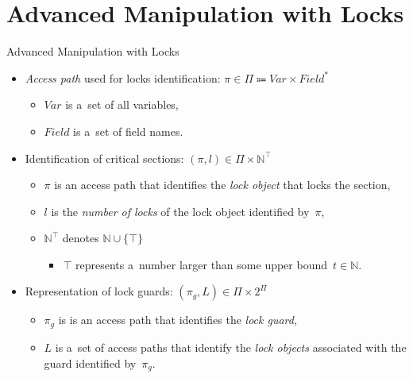 \documentclass[10pt, xcolor=pdflatex, hyperref={unicode}, aspectratio=169]{beamer}
\begin{document}
\section{Advanced Manipulation with Locks}
\begin{frame}{Advanced Manipulation with Locks}
    \begin{itemize}\setlength\itemsep{1.5em}
        \item \emph{Access path} used for \alert{locks identification}: $ \pi \in \Pi \Coloneqq Var \times Field^* $
            \smallskip
            \begin{itemize}\setlength\itemsep{.8em}
                \item $ Var $ is a~set of all variables,

                \item $ Field $ is a~set of field names.
            \end{itemize}

        \item Identification of \alert{critical sections}: $ (\pi, l) \in \Pi \times \mathbb{N}^\top $
            \smallskip
            \begin{itemize}\setlength\itemsep{.8em}
                \item $ \pi $ is an access path that identifies the \emph{lock object} that locks the section,

                \item $ l $ is the \emph{number of locks} of the lock object identified by~$ \pi $,

                \item $ \mathbb{N}^\top $ denotes $ \mathbb{N} \cup \{\top\} $
                    \smallskip
                    \begin{itemize}
                        \item $ \top $ represents a~number larger than some \alert{upper bound}~$ t \in \mathbb{N} $.
                    \end{itemize}
            \end{itemize}

        \item Representation of \alert{lock guards}: $ (\pi_g, L) \in \Pi \times 2^\Pi $
            \smallskip
            \begin{itemize}\setlength\itemsep{.8em}
                \item $ \pi_g $ is is an access path that identifies the \emph{lock guard},

                \item $ L $ is a~set of access paths that identify the \emph{lock objects} associated with the guard identified by~$ \pi_g $.
            \end{itemize}
    \end{itemize}
\end{frame}


\end{document}
